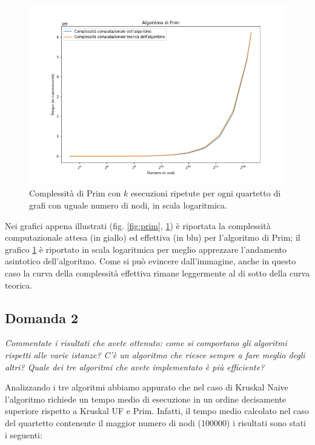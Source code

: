 \begin{figure}[H]
	\centering
	\includegraphics[width=1\textwidth]{res/images/graph-log/prim_scala_logaritmica.png}
	\caption{Complessità di Prim con \(k\) esecuzioni ripetute per ogni quartetto di grafi con uguale numero di nodi, in scala logaritmica.}
	\label{fig:prim_log}
\end{figure}


Nei grafici appena illustrati (fig. \ref{fig:prim}, \ref{fig:prim_log}) è riportata la complessità computazionale attesa (in giallo) ed effettiva (in blu) per l'algoritmo di Prim; il grafico \ref{fig:prim_log} è riportato in scala logaritmica per meglio apprezzare l'andamento asintotico dell'algoritmo.
Come si può evincere dall'immagine, anche in questo caso la curva della complessità effettiva rimane leggermente al di sotto della curva teorica.




\subsection{Domanda 2}
\textit{Commentate i risultati che avete ottenuto: come si comportano gli
algoritmi rispetti alle varie istanze? C'è un algoritmo che riesce sempre a fare meglio
degli altri? Quale dei tre algoritmi che avete implementato è più efficiente?}


Analizzando i tre algoritmi abbiamo appurato che nel caso di Kruskal Naive l'algoritmo richiede un tempo medio di esecuzione in un ordine decisamente superiore rispetto a Kruskal UF e Prim. Infatti, il tempo medio calcolato nel caso del quartetto contenente il maggior numero di nodi (100000) i risultati sono stati i seguenti:

